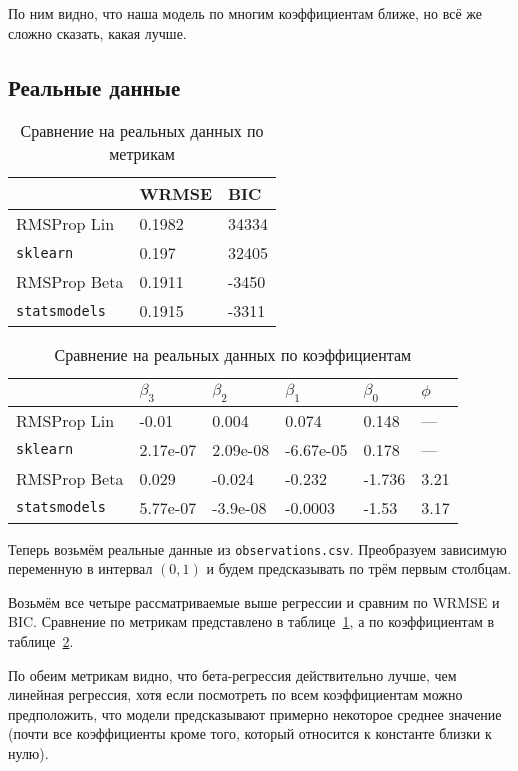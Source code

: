 \documentclass[12pt]{article}
\begin{document}
	По ним видно, что наша модель по многим коэффициентам ближе, но всё же сложно сказать, какая лучше.
	
	\subsection{Реальные данные}
	
	\begin{table}[!h]
		\centering
		\caption{Сравнение на реальных данных по метрикам}
		\begin{tabular}{|l|l|l|}
			\hline
			& WRMSE & BIC \\ \hline
			RMSProp Lin & 0.1982 & 34334 \\ \hline
			\verb|sklearn| & 0.197 & 32405 \\ \hline
			RMSProp Beta & 0.1911 & -3450 \\ \hline
			\verb|statsmodels| & 0.1915 & -3311 \\ \hline
		\end{tabular}
		\label{table4}
	\end{table}
	
	\begin{table}[!h]
		\centering
		\caption{Сравнение на реальных данных по коэффициентам}
		\begin{tabular}{|l|l|l|l|l|l|}
			\hline
			& $\beta _3$ & $\beta _2$ &$\beta _1$ &$\beta _0$ & $\phi$ \\ \hline
			RMSProp Lin & -0.01 & 0.004 & 0.074 & 0.148 & --- \\ \hline
			\verb|sklearn| & 2.17e-07 & 2.09e-08 & -6.67e-05 & 0.178 & --- \\ \hline
			RMSProp Beta & 0.029 & -0.024 & -0.232 & -1.736 & 3.21 \\ \hline
			\verb|statsmodels| & 5.77e-07 & -3.9e-08 & -0.0003 & -1.53 & 3.17 \\ \hline
		\end{tabular}
		\label{table5}
	\end{table}
	
	Теперь возьмём реальные данные из \verb|observations.csv|. Преобразуем зависимую переменную в интервал $(0, 1)$ и будем предсказывать по трём первым столбцам.
	
	Возьмём все четыре рассматриваемые выше регрессии и сравним по WRMSE и BIC. Сравнение по метрикам представлено в таблице~\ref{table4}, а по коэффициентам в таблице~\ref{table5}.
	
	По обеим метрикам видно, что бета-регрессия действительно лучше, чем линейная регрессия, хотя если посмотреть по всем коэффициентам можно предположить, что модели предсказывают примерно некоторое среднее значение (почти все коэффициенты кроме того, который относится к константе близки к нулю).
	
\end{document}
